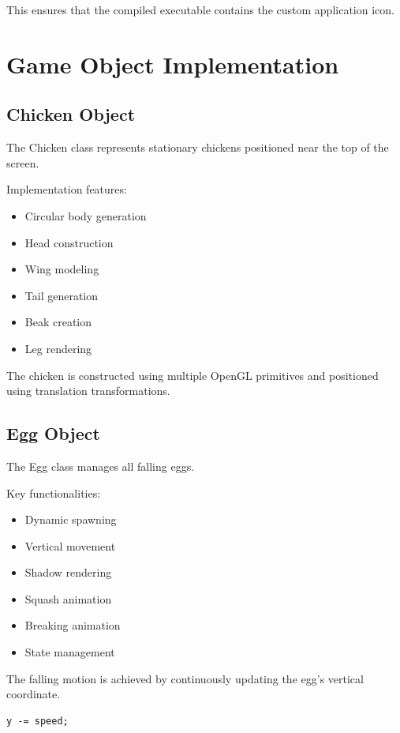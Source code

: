 \documentclass[12pt,a4paper]{report}
\begin{document}
This ensures that the compiled executable contains the custom application icon.

\section{Game Object Implementation}

\subsection*{Chicken Object}

The Chicken class represents stationary chickens positioned near the top of the screen.

Implementation features:

\begin{itemize}
\item Circular body generation
\item Head construction
\item Wing modeling
\item Tail generation
\item Beak creation
\item Leg rendering
\end{itemize}

The chicken is constructed using multiple OpenGL primitives and positioned using translation transformations.

\subsection*{Egg Object}

The Egg class manages all falling eggs.

Key functionalities:

\begin{itemize}
\item Dynamic spawning
\item Vertical movement
\item Shadow rendering
\item Squash animation
\item Breaking animation
\item State management
\end{itemize}

The falling motion is achieved by continuously updating the egg's vertical coordinate.

\begin{verbatim}
y -= speed;
\end{verbatim}
\end{document}
